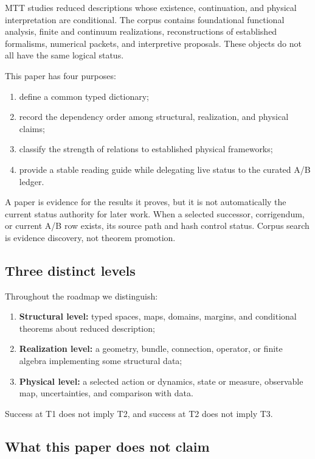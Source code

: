 \documentclass[11pt]{article}
\begin{document}
MTT studies reduced descriptions whose existence, continuation, and physical
interpretation are conditional.  The corpus contains foundational functional
analysis, finite and continuum realizations, reconstructions of established
formalisms, numerical packets, and interpretive proposals.  These objects do
not all have the same logical status.

This paper has four purposes:
\begin{enumerate}[label=\arabic*.]
\item define a common typed dictionary;
\item record the dependency order among structural, realization, and physical
claims;
\item classify the strength of relations to established physical frameworks;
\item provide a stable reading guide while delegating live status to the
curated A/B ledger.
\end{enumerate}

\begin{remark}
A paper is evidence for the results it proves, but it is not automatically the
current status authority for later work.  When a selected successor,
corrigendum, or current A/B row exists, its source path and hash control
status.  Corpus search is evidence discovery, not theorem promotion.
\end{remark}

\subsection{Three distinct levels}

Throughout the roadmap we distinguish:
\begin{enumerate}[label=\textbf{T\arabic*.}]
\item \textbf{Structural level:} typed spaces, maps, domains, margins, and
conditional theorems about reduced description;
\item \textbf{Realization level:} a geometry, bundle, connection, operator, or
finite algebra implementing some structural data;
\item \textbf{Physical level:} a selected action or dynamics, state or measure,
observable map, uncertainties, and comparison with data.
\end{enumerate}
Success at T1 does not imply T2, and success at T2 does not imply T3.

\subsection{What this paper does not claim}
\end{document}
